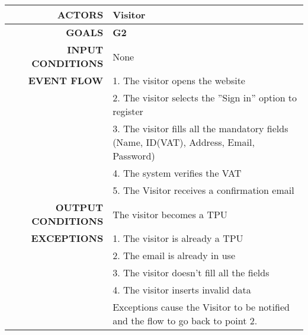 \begin{table}[h!]
\begin{tabular}{|r|p{3in}|}
\hline
\textbf{ACTORS} & Visitor\\
\hline
\textbf{GOALS} & \textbf{G2} \\
\hline
\textbf{INPUT CONDITIONS} & None \\
\hline
\textbf{EVENT FLOW} 
&1. The visitor opens the website \\
&2. The visitor selects the ''Sign in'' option to register \\
&3. The visitor fills all the mandatory fields (Name, ID(VAT), Address, Email, Password) \\
&4. The system verifies the VAT\\
&5. The Visitor receives a confirmation email \\
\hline
\textbf{OUTPUT CONDITIONS} & The visitor becomes a TPU \\
\hline
\textbf{EXCEPTIONS} 
&1. The visitor is already a TPU \\
&2. The email is already in use \\
&3. The visitor doesn't fill all the fields\\
&4. The visitor inserts invalid data \\
&Exceptions cause the Visitor to be notified and the flow to go back to point 2.\\
\hline
\end{tabular}
\end{table}